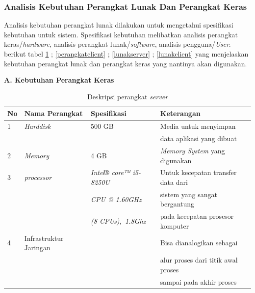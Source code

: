 \subsubsection{Analisis Kebutuhan Perangkat Lunak Dan Perangkat  Keras }
\par
Analisis kebutuhan perangkat lunak dilakukan untuk mengetahui spesifikasi kebutuhan untuk sistem. Spesifikasi kebutuhan melibatkan analisis perangkat keras/\textit{hardware}, analisis perangkat lunak/\textit{software}, analisis pengguna/\textit{User}. berikut tabel \ref{perangkatserver} ; \ref{perangkatclient} ; \ref{lunakserver} ; \ref{lunakclient} yang menjelaskan kebutuhan perangkat lunak dan perangkat keras yang nantinya akan digunakan.

\textbf{A.	Kebutuhan Perangkat Keras}

\begin{table}[!htbp]
\captionsetup{singlelinecheck=off}
\caption{Deskripsi perangkat \textit{server}}
\label{perangkatserver}
\begin{tabular}{|l|l|l|l|}
\hline
No & Nama Perangkat & Spesifikasi & Keterangan \\
\hline

1 &  \textit{Harddisk} & 500 GB  & Media untuk menyimpan \\
 & & & data aplikasi yang dibuat  \\
\hline

2 &  \textit{Memory} & 4 GB & \textit{Memory System} yang digunakan  \\
\hline

3 &  \textit{processor} & \textit{Intel® core™ i5-8250U  } &  Untuk kecepatan transfer data dari \\

 & & \textit{CPU @ 1.60GHz} &  sistem yang sangat bergantung \\
 
 & &\textit{(8 CPUs),~1.8Ghz} & pada kecepatan prosesor komputer \\
\hline

4 &  Infrastruktur Jaringan &    & Bisa dianalogikan sebagai \\     & & &  alur proses dari titik awal proses \\
& & & sampai pada akhir proses  \\

\hline
\end{tabular}
\end{table}


